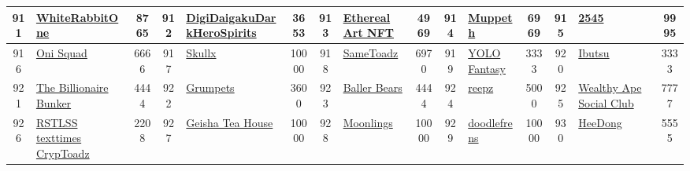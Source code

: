 \begin{table*}[]
{\begin{tabular}{|c|l|c|c|l|c|c|l|c|c|l|c|c|l|c|}
        911   & \href{https://rabbitff.com/}{WhiteRabbitOne}                                       & 8765              & 912   & \href{https://digidaigaku.com/}{DigiDaigakuDarkHeroSpirits}                                       & 3653              & 913   & \href{https://etherealartnft.com/}{Ethereal Art NFT}                              & 4969              & 914   & \href{http://muppeth.com}{Muppeth}                                            & 6969              & 915   & \href{https://2545.io}{2545}                                                              & 9995                                    \\ \hline
        916   & \href{https://yomigames.gg}{Oni Squad}                                             & 6666              & 917   & \href{http://skullx.com}{Skullx}                                                                  & 10000             & 918   & \href{https://www.sametoadz.com/}{SameToadz}                                      & 6970              & 919   & \href{http://yolo.art}{YOLO Fantasy}                                          & 3333              & 920   & \href{https://ibutsu.io/}{Ibutsu}                                                         & 3333                                    \\ \hline
        921   & \href{http://thebillionairebunker.io}{The Billionaire Bunker}                      & 4444              & 922   & \href{http://grumpets.com}{Grumpets}                                                              & 3600              & 923   & \href{https://ballerbearsnft.com}{Baller Bears}                                   & 4444              & 924   & \href{http://reepz.xyz}{reepz}                                                & 5000              & 925   & \href{https://www.wealthyapesocialclub.com/}{Wealthy Ape Social Club}                     & 7777                                    \\ \hline
        926   & \href{https://rstlss.xyz}{RSTLSS texttimes{} CrypToadz}                          & 2208              & 927   & \href{https://geishateahouse.com}{Geisha Tea House}                                               & 10000             & 928   & \href{https://www.moonlings.space}{Moonlings}                                     & 10000             & 929   & \href{https://opensea.io/collection/doodlefrensnft}{doodlefrens}              & 10000             & 930   & \href{https://heedong.io}{HeeDong}                                                        & 5555                                    \\ \hline

\end{tabular}}
\end{table*}
